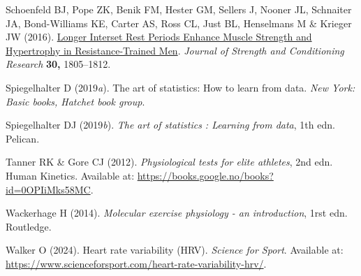 \documentclass[
  letterpaper,
  DIV=11,
  numbers=noendperiod]{scrreprt}
\newlength{\cslhangindent}
\newenvironment{CSLReferences}[2] %
 {\begin{list}{}{%
  \setlength{\itemindent}{0pt}
  \setlength{\leftmargin}{0pt}
  \setlength{\parsep}{0pt}
  \ifodd #1
   \setlength{\leftmargin}{\cslhangindent}
   \setlength{\itemindent}{-1\cslhangindent}
  \fi
  \setlength{\itemsep}{#2\baselineskip}}}
 {\end{list}}
\begin{document}
\begin{CSLReferences}{1}{1}
Schoenfeld BJ, Pope ZK, Benik FM, Hester GM, Sellers J, Nooner JL,
Schnaiter JA, Bond-Williams KE, Carter AS, Ross CL, Just BL, Henselmans
M \& Krieger JW (2016).
\href{https://doi.org/10.1519/jsc.0000000000001272}{Longer Interset Rest
Periods Enhance Muscle Strength and Hypertrophy in Resistance-Trained
Men}. \emph{Journal of Strength and Conditioning Research} \textbf{30,}
1805--1812.

Spiegelhalter D (2019\emph{a}). The art of statistics: How to learn from
data. \emph{New York: Basic books, Hatchet book group}.

Spiegelhalter DJ (2019\emph{b}). \emph{The art of statistics : Learning
from data}, 1th edn. Pelican.

Tanner RK \& Gore CJ (2012). \emph{Physiological tests for elite
athletes}, 2nd edn. Human Kinetics. Available at:
\url{https://books.google.no/books?id=0OPIiMks58MC}.

Wackerhage H (2014). \emph{Molecular exercise physiology - an
introduction}, 1rst edn. Routledge.

Walker O (2024). Heart rate variability (HRV). \emph{Science for Sport}.
Available at:
\url{https://www.scienceforsport.com/heart-rate-variability-hrv/}.

\end{CSLReferences}
\end{document}
